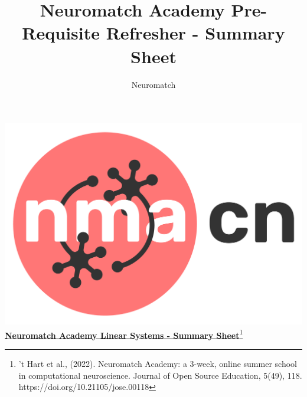 \documentclass[10pt,a4paper]{article}
\title{Neuromatch Academy Pre-Requisite Refresher - Summary Sheet}
\author{Neuromatch}
\begin{document}
\includegraphics[scale=0.03]{Figures/NMACN.png}\href{https://compneuro.neuromatch.io/tutorials/intro.html}{\textbf{\Huge{Neuromatch Academy Linear Systems - Summary Sheet}}\footnote{’t Hart et al., (2022). Neuromatch Academy: a 3-week, online summer school in computational neuroscience. Journal of Open Source Education, 5(49), 118. https://doi.org/10.21105/jose.00118}}
\small
\begin{multicols}{3}

\let\clearpage\relax

\end{multicols}

%

%
\end{document}
